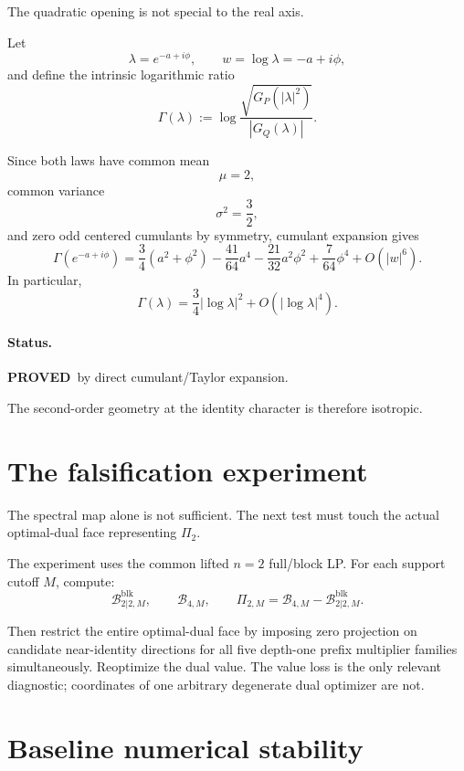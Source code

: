 \documentclass[11pt,a4paper]{article}
\newcommand{\Bcal}{\mathcal B}
\newcommand{\blk}{\mathrm{blk}}
\newcommand{\PROVED}{\textcolor{green!45!black}{\textbf{PROVED}}}
\begin{document}
The quadratic opening is not special to the real axis.

Let
\[
\lambda=e^{-a+i\phi},
\qquad
w=\log\lambda=-a+i\phi,
\]
and define the intrinsic logarithmic ratio
\[
\Gamma(\lambda)
:=
\log
\frac{
\sqrt{G_P(|\lambda|^2)}
}{
|G_Q(\lambda)|
}.
\]

Since both laws have common mean
\[
\mu=2,
\]
common variance
\[
\sigma^2=\frac32,
\]
and zero odd centered cumulants by symmetry, cumulant expansion gives
\begin{equation}
\boxed{
\Gamma(e^{-a+i\phi})
=
\frac34(a^2+\phi^2)
-\frac{41}{64}a^4
-\frac{21}{32}a^2\phi^2
+\frac7{64}\phi^4
+O(|w|^6).
}
\tag{26}
\end{equation}
In particular,
\begin{equation}
\boxed{
\Gamma(\lambda)
=
\frac34|\log\lambda|^2
+
O(|\log\lambda|^4).
}
\tag{27}
\end{equation}

\paragraph{Status.}
\PROVED\ by direct cumulant/Taylor expansion.

The second-order geometry at the identity character is therefore isotropic.

\section{The falsification experiment}

The spectral map alone is not sufficient.
The next test must touch the actual optimal-dual face representing
\(\Pi_2\).

The experiment uses the common lifted \(n=2\) full/block LP.
For each support cutoff \(M\), compute:
\[
\Bcal^{\blk}_{2|2,M},
\qquad
\Bcal_{4,M},
\qquad
\Pi_{2,M}
=
\Bcal_{4,M}-\Bcal^{\blk}_{2|2,M}.
\]

Then restrict the entire optimal-dual face by imposing zero projection on
candidate near-identity directions for all five depth-one prefix multiplier
families simultaneously.
Reoptimize the dual value.
The value loss is the only relevant diagnostic; coordinates of one arbitrary
degenerate dual optimizer are not.

\section{Baseline numerical stability}
\end{document}
